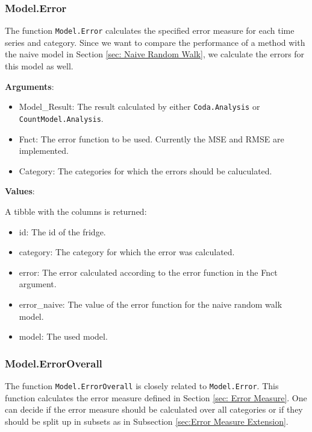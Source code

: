 \subsubsection{Model.Error}
\label{sec:Model.Error}

The function \texttt{Model.Error} calculates the specified error measure for each time series and category. Since we want to compare the performance of a method with the naive model in Section \ref{sec: Naive Random Walk}, we calculate the errors for this model as well. 

\textbf{Arguments}:

\begin{itemize}
	\item Model\_Result: The result calculated by either \texttt{Coda.Analysis} or \texttt{CountModel.Analysis}.
	\item Fnct: The error function to be used. Currently the MSE and RMSE are implemented. 
	\item Category: The categories for which the errors should be caluculated.
\end{itemize}

\textbf{Values}:

A tibble with the columns is returned: 

\begin{itemize}
	\item id: The id of the fridge.
	\item category: The category for which the error was calculated. 
	\item error: The error calculated according to the error function in the Fnct argument. 
	\item error\_naive: The value of the error function for the naive random walk model.
	\item model: The used model.  
\end{itemize}

\subsubsection{Model.ErrorOverall}
\label{sec:Model.ErrorOverall}

The function \texttt{Model.ErrorOverall} is closely related to \texttt{Model.Error}. This function calculates the error measure defined in Section \ref{sec: Error Measure}. One can decide if the error measure should be calculated over all categories or if they should be split up in subsets as in Subsection \ref{sec:Error Measure Extension}.

